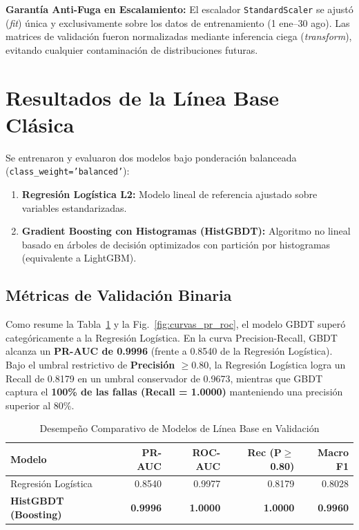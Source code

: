 \documentclass[conference]{IEEEtran}
\begin{document}
\textbf{Garantía Anti-Fuga en Escalamiento:} El escalador \texttt{StandardScaler} se ajustó (\textit{fit}) única y exclusivamente sobre los datos de entrenamiento (1 ene--30 ago). Las matrices de validación fueron normalizadas mediante inferencia ciega (\textit{transform}), evitando cualquier contaminación de distribuciones futuras.

\section{Resultados de la Línea Base Clásica}
Se entrenaron y evaluaron dos modelos bajo ponderación balanceada (\texttt{class\_weight='balanced'}):
\begin{enumerate}
    \item \textbf{Regresión Logística L2:} Modelo lineal de referencia ajustado sobre variables estandarizadas.
    \item \textbf{Gradient Boosting con Histogramas (HistGBDT):} Algoritmo no lineal basado en árboles de decisión optimizados con partición por histogramas (equivalente a LightGBM).
\end{enumerate}

\subsection{Métricas de Validación Binaria}
Como resume la Tabla~\ref{tab:resultados_baseline} y la Fig.~\ref{fig:curvas_pr_roc}, el modelo GBDT superó categóricamente a la Regresión Logística. En la curva Precision-Recall, GBDT alcanza un \textbf{PR-AUC de 0.9996} (frente a 0.8540 de la Regresión Logística). Bajo el umbral restrictivo de \textbf{Precisión $\ge 0.80$}, la Regresión Logística logra un Recall de 0.8179 en un umbral conservador de 0.9673, mientras que GBDT captura el \textbf{100\% de las fallas (Recall = 1.0000)} manteniendo una precisión superior al 80\%.

\begin{table}[htbp]
\caption{Desempeño Comparativo de Modelos de Línea Base en Validación}
\label{tab:resultados_baseline}
\centering
\begin{tabular}{lrrrr}
\toprule
\textbf{Modelo} & \textbf{PR-AUC} & \textbf{ROC-AUC} & \textbf{Rec (P$\ge$0.80)} & \textbf{Macro F1} \\
\midrule
Regresión Logística & 0.8540 & 0.9977 & 0.8179 & 0.8028 \\
\textbf{HistGBDT (Boosting)} & \textbf{0.9996} & \textbf{1.0000} & \textbf{1.0000} & \textbf{0.9960} \\
\bottomrule
\end{tabular}
\end{table}
\end{document}
